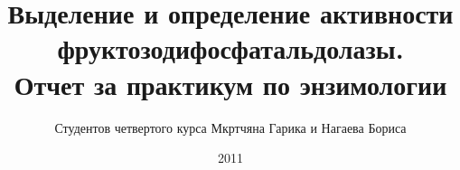 \documentclass[a4paper,titlepage,12pt]{article}
\title{Выделение и определение активности фруктозодифосфатальдолазы.\\
    Отчет за практикум по энзимологии}
\author{Студентов четвертого курса
    Мкртчяна Гарика и Нагаева Бориса}
\date{2011}
\begin{document}
\maketitle
\thispagestyle{empty}

\begin{abstract}

\end{abstract}

\setcounter{page}{3}

\tableofcontents
\newpage







\end{document}
